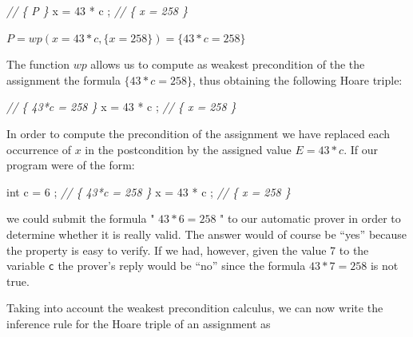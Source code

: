 \documentclass[12pt,francais,]{scrbook}
\newenvironment{Shaded}{}{}
\newcommand{\DataTypeTok}[1]{\textcolor[rgb]{0.56,0.13,0.00}{{#1}}}
\newcommand{\DecValTok}[1]{\textcolor[rgb]{0.25,0.63,0.44}{{#1}}}
\newcommand{\CommentTok}[1]{\textcolor[rgb]{0.38,0.63,0.69}{\textit{{#1}}}}
\newcommand{\NormalTok}[1]{{#1}}
\begin{document}
\begin{footnotesize}\begin{Shaded}
\begin{Highlighting}[]
\CommentTok{// \{ P \}}
\NormalTok{x = }\DecValTok{43} \NormalTok{* c ;}
\CommentTok{// \{ x = 258 \}}
\end{Highlighting}
\end{Shaded}\end{footnotesize}

\begin{center} \(P = wp(x = 43*c , \{x = 258\}) = \{43*c = 258\}\)
\end{center}

The function \(wp\) allows us to compute as weakest precondition of the
the assignment the formula \(\{43*c = 258\}\), thus obtaining the
following Hoare triple:

\begin{footnotesize}\begin{Shaded}
\begin{Highlighting}[]
\CommentTok{// \{ 43*c = 258 \}}
\NormalTok{x = }\DecValTok{43} \NormalTok{* c ;}
\CommentTok{// \{ x = 258 \}}
\end{Highlighting}
\end{Shaded}\end{footnotesize}

In order to compute the precondition of the assignment we have replaced
each occurrence of \(x\) in the postcondition by the assigned value
\(E = 43*c\). If our program were of the form:

\begin{footnotesize}\begin{Shaded}
\begin{Highlighting}[]
\DataTypeTok{int} \NormalTok{c = }\DecValTok{6} \NormalTok{;}
\CommentTok{// \{ 43*c = 258 \}}
\NormalTok{x = }\DecValTok{43} \NormalTok{* c ;}
\CommentTok{// \{ x = 258 \}}
\end{Highlighting}
\end{Shaded}\end{footnotesize}

we could submit the formula " \(43*6 = 258\) " to our automatic prover
in order to determine whether it is really valid. The answer would of
course be ``yes'' because the property is easy to verify. If we had,
however, given the value 7 to the variable \texttt{c} the prover's reply
would be ``no'' since the formula \(43*7 = 258\) is not true.

Taking into account the weakest precondition calculus, we can now write
the inference rule for the Hoare triple of an assignment as
\end{document}

